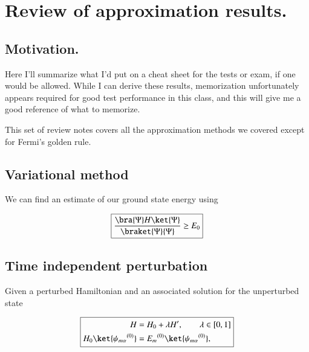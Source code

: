 %
%

\chapter{Review of approximation results.}
\label{chap:qmTwoReview}
{}
\date{Nov 6, 2011}

\beginArtWithToc

\section{Motivation.}

Here I'll summarize what I'd put on a cheat sheet for the tests or exam, if one would be allowed.  While I can derive these results, memorization unfortunately appears required for good test performance in this class, and this will give me a good reference of what to memorize.

This set of review notes covers all the approximation methods we covered except for Fermi's golden rule.

\section{Variational method}

We can find an estimate of our ground state energy using

\begin{equation}\label{eqn:qmTwoReview:310}
\boxed{
\frac{
\bra{\Psi} H \ket{\Psi}
}{
\braket{\Psi}{\Psi}
}
\ge E_0
}
\end{equation}

\section{Time independent perturbation}

Given a perturbed Hamiltonian and an associated solution for the unperturbed state

\begin{equation}\label{eqn:qmTwoReview:330}
\boxed{
\begin{aligned}
H &= H_0 + \lambda H', \qquad \lambda \in [0,1] \\
H_0 \ket{{\psi_{m\alpha}}^{(0)}} &= {E_m}^{(0)} \ket{{\psi_{m\alpha}}^{(0)}},
\end{aligned}
}
\end{equation}

